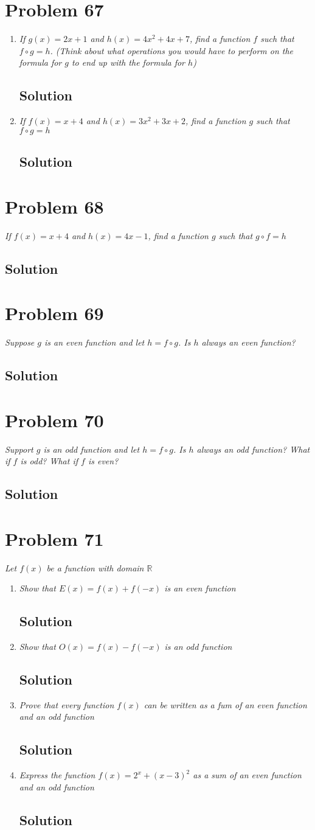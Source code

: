 \documentclass[11pt]{article}
\newcommand{\soln}{\subsection*}
\newcommand{\qn}{\textit}
\begin{document}
\section*{Problem 67}

\begin{enumerate}
	\item \qn{If $g(x)=2x+1$ and $h(x)=4x^2+4x+7$, find a function $f$ such that $f \circ g=h$. (Think about what operations you would have to perform on the formula for $g$ to end up with the formula for $h$)}
	\soln{Solution}
	
	\item \qn{If $f(x)=x+4$ and $h(x)=3x^2+3x+2$, find a function $g$ such that $f \circ g=h$}
	\soln{Solution}
\end{enumerate}

\section*{Problem 68}

\qn{If $f(x)=x+4$ and $h(x)=4x-1$, find a function $g$ such that $g \circ f=h$}

\soln{Solution}

\section*{Problem 69}

\qn{Suppose $g$ is an even function and let $h=f \circ g$. Is $h$ always an even function?}

\soln{Solution}

\section*{Problem 70}

\qn{Support $g$ is an odd function and let $h=f \circ g$. Is $h$ always an odd function? What if $f$ is odd? What if $f$ is even?}

\soln{Solution}

\section*{Problem 71}

\qn{Let $f(x)$ be a function with domain $\mathbb{R}$}

\begin{enumerate}
	\item \qn{Show that $E(x)=f(x)+f(-x)$ is an even function}
	\soln{Solution}
	
	\item \qn{Show that $O(x)=f(x)-f(-x)$ is an odd function}
	\soln{Solution}
	
	\item \qn{Prove that every function $f(x)$ can be written as a fum of an even function and an odd function}
	\soln{Solution}
	
	\item \qn{Express the function $f(x)=2^x+(x-3)^2$ as a sum of an even function and an odd function}
	\soln{Solution}
\end{enumerate}
	
\end{document}

